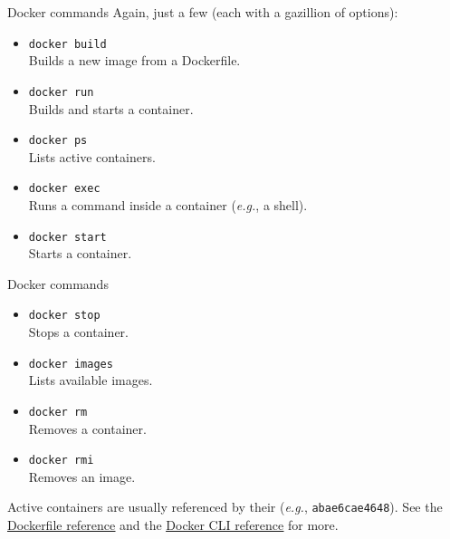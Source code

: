 \begin{frame}{Docker commands}
	Again, just a few (each with a gazillion of options):
	\begin{itemize}
		\item \texttt{docker build}\\Builds a new image from a Dockerfile.
		\item \texttt{docker run}\\Builds and starts a container.
		\item \texttt{docker ps}\\Lists active containers.
		\item \texttt{docker exec}\\Runs a command inside a container (\emph{e.g.}, a shell).
		\item \texttt{docker start}\\Starts a container.
	\end{itemize}
\end{frame}
\begin{frame}{Docker commands}
	\begin{itemize}
		\item \texttt{docker stop}\\Stops a container.
		\item \texttt{docker images}\\Lists available images.
		\item \texttt{docker rm}\\Removes a container.
		\item \texttt{docker rmi}\\Removes an image.
	\end{itemize}
	Active containers are usually referenced by their  (\emph{e.g.}, \texttt{abae6cae4648}).
	\newline\newline
	See the \href{https://docs.docker.com/engine/reference/builder/}{\color{blue}\underline{Dockerfile reference}} and the \href{https://docs.docker.com/engine/reference/commandline/docker/}{\color{blue}\underline{Docker CLI reference}} for more.
\end{frame}

